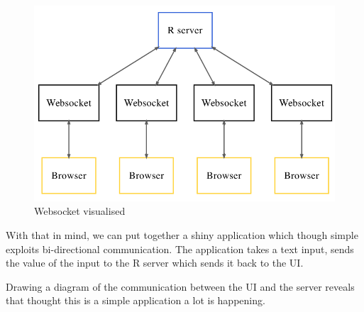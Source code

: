 \documentclass[
  10pt,
]{krantz}
\makeatletter
\newenvironment{Shaded}{\begin{snugshade}}{\end{snugshade}}
\newcommand{\ControlFlowTok}[1]{\textcolor[rgb]{0.27,0.27,0.27}{\textbf{#1}}}
\newcommand{\KeywordTok}[1]{\textcolor[rgb]{0.27,0.27,0.27}{\textbf{#1}}}
\newcommand{\NormalTok}[1]{#1}
\newcommand{\OperatorTok}[1]{\textcolor[rgb]{0.43,0.43,0.43}{\textbf{#1}}}
\newcommand{\StringTok}[1]{\textcolor[rgb]{0.5,0.5,0.5}{#1}}
\newenvironment{kframe}{%
\medskip{}
\setlength{\fboxsep}{.8em}
 \def\at@end@of@kframe{}%
 \ifinner\ifhmode%
  \def\at@end@of@kframe{\end{minipage}}%
  \begin{minipage}{\columnwidth}%
 \fi\fi%
 \def\FrameCommand##1{\hskip\@totalleftmargin \hskip-\fboxsep
 \colorbox{shadecolor}{##1}\hskip-\fboxsep
     \hskip-\linewidth \hskip-\@totalleftmargin \hskip\columnwidth}%
 \MakeFramed {\advance\hsize-\width
   \@totalleftmargin\z@ \linewidth\hsize
   \@setminipage}}%
 {\par\unskip\endMakeFramed%
 \at@end@of@kframe}
\renewenvironment{Shaded}{\begin{kframe}}{\end{kframe}}
\makeatother
\begin{document}
\begin{figure}[H]

{\centering \includegraphics[width=1\linewidth]{images/04-websocket} 

}

\caption{Websocket visualised}\label{fig:unnamed-chunk-2}
\end{figure}

With that in mind, we can put together a shiny application which though simple exploits bi-directional communication. The application takes a text input, sends the value of the input to the R server which sends it back to the UI.

\begin{Shaded}
\end{Shaded}

Drawing a diagram of the communication between the UI and the server reveals that thought this is a simple application a lot is happening.
\end{document}

